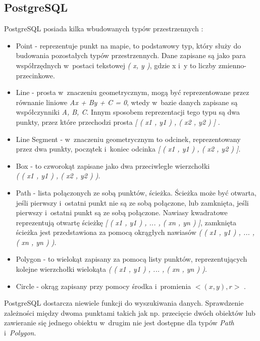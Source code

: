 \documentclass[printmode]{mgr}
\begin{document}
\subsection{PostgreSQL}
PostgreSQL posiada kilka wbudowanych typów przestrzennych \cite{doc_postgresql}: 
\begin{itemize}
  \item Point - reprezentuje punkt na mapie, to podstawowy typ, który służy do budowania pozostałych typów przestrzennych. Dane zapisane są jako para współrzędnych w~postaci tekstowej \textit{( x, y )}, gdzie x i~y to liczby zmienno-przecinkowe.
  \item Line - prosta w~znaczeniu geometrycznym, mogą być reprezentowane przez równanie liniowe \textit{Ax + By + C = 0}, wtedy w~bazie danych zapisane są współczynniki \textit{A, B, C}. Innym sposobem reprezentacji tego typu są dwa punkty, przez które przechodzi prosta \textit{[ ( x1 , y1 ) , ( x2 , y2 ) ]
  }.
  \item Line Segment - w~znaczeniu geometrycznym to odcinek, reprezentowany przez dwa punkty, początek i~koniec odcinka \textit{[ ( x1 , y1 ) , ( x2 , y2 ) ]}.
  \item Box - to czworokąt zapisane jako dwa przeciwległe wierzchołki\\ \textit{( ( x1 , y1 ) , ( x2 , y2 ) )}.
  \item Path - lista połączonych ze sobą punktów, ścieżka. Ścieżka może być otwarta, jeśli pierwszy i~ostatni punkt nie są ze sobą połączone, lub zamknięta, jeśli pierwszy i~ostatni punkt są ze sobą połączone. Nawiasy kwadratowe reprezentują otwartę ścieżkę \textit{[ ( x1 , y1 ) , ... , ( xn , yn ) ]}, zamknięta ścieżka jest przedstawiona za pomocą okrągłych nawiasów \textit{( ( x1 , y1 ) , ... , ( xn , yn ) )}.
  \item Polygon - to wielokąt zapisany za pomocą listy punktów, reprezentujących kolejne wierzchołki wielokąta \textit{( ( x1 , y1 ) , ... , ( xn , yn ) )}.
  \item Circle - okrąg zapisany przy pomocy środka i~promienia \textit{  $< ( x , y ) , r >$ }.
\end{itemize}
PostgreSQL dostarcza niewiele funkcji do wyszukiwania danych. Sprawdzenie zależności między dwoma punktami takich jak np. przecięcie dwóch obiektów lub zawieranie się jednego obiektu w~drugim nie jest dostępne dla typów \textit{Path} i~\textit{Polygon}. 
\end{document}
